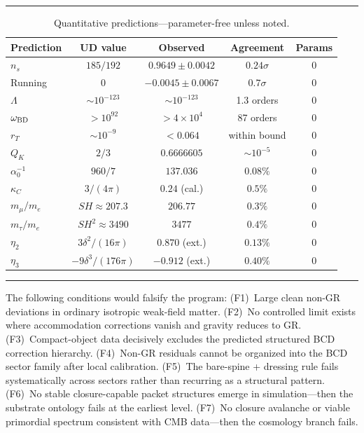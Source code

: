 \documentclass[11pt,twocolumn]{article}
\newenvironment{ruledtabular}{\hrule\vspace{4pt}}{\vspace{4pt}\hrule}
\begin{document}
\begin{table}[h!]
\centering
\caption{Quantitative predictions---parameter-free unless noted.}
\begin{ruledtabular}
\begin{tabular}{l c c c c}
Prediction & UD value & Observed & Agreement & Params \\
\hline
$n_s$ & $185/192$ & $0.9649 \pm 0.0042$ & $0.24\sigma$ & 0 \\
Running & 0 & $-0.0045 \pm 0.0067$ & $0.7\sigma$ & 0 \\
$\Lambda$ & $\sim 10^{-123}$ & $\sim 10^{-123}$ & 1.3 orders & 0 \\
$\omega_{\rm BD}$ & $> 10^{92}$ & $> 4\times10^4$ & 87 orders & 0 \\
$r_T$ & $\sim 10^{-9}$ & $< 0.064$ & within bound & 0 \\
$Q_K$ & $2/3$ & $0.6666605$ & $\sim 10^{-5}$ & 0 \\
$\alpha_0^{-1}$ & $960/7$ & $137.036$ & $0.08\%$ & 0 \\
$\kappa_C$ & $3/(4\pi)$ & $0.24$ (cal.) & $0.5\%$ & 0 \\
$m_\mu/m_e$ & $SH \approx 207.3$ & $206.77$ & $0.3\%$ & 0 \\
$m_\tau/m_e$ & $SH^2 \approx 3490$ & $3477$ & $0.4\%$ & 0 \\
$\eta_2$ & $3\delta^2/(16\pi)$ & $0.870$ (ext.) & $0.13\%$ & 0 \\
$\eta_3$ & $-9\delta^3/(176\pi)$ & $-0.912$ (ext.) & $0.40\%$ & 0 \\
\end{tabular}
\end{ruledtabular}
\label{tab:predictions}
\end{table}

The following conditions would falsify the program:
(F1)~Large clean non-GR deviations in ordinary isotropic weak-field matter.
(F2)~No controlled limit exists where accommodation corrections vanish and gravity reduces to GR.
(F3)~Compact-object data decisively excludes the predicted structured BCD correction hierarchy.
(F4)~Non-GR residuals cannot be organized into the BCD sector family after local calibration.
(F5)~The bare-spine + dressing rule fails systematically across sectors rather than recurring as a structural pattern.
(F6)~No stable closure-capable packet structures emerge in simulation---then the substrate ontology fails at the earliest level.
(F7)~No closure avalanche or viable primordial spectrum consistent with CMB data---then the cosmology branch fails.
\end{document}
